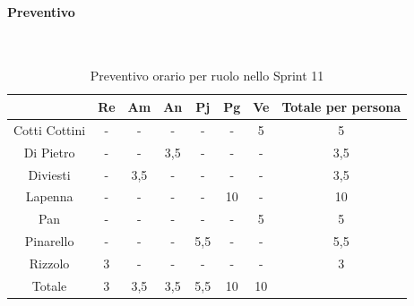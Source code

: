 \documentclass{article}
\begin{document}
                \paragraph{Preventivo}\mbox{}\\
                \begin{table}[H]
                    \centering
                    \begin{tabular}{|c|c|c|c|c|c|c|c|}
                    \hline
                                  & Re  & Am  & An  & Pj  & Pg  & Ve  & Totale per persona \\ \hline
                    Cotti Cottini & -   & -   & -   & -   & -   & 5   & 5                  \\ \hline
                    Di Pietro     & -   & -   & 3,5 & -   & -   & -   & 3,5                \\ \hline
                    Diviesti      & -   & 3,5 & -   & -   & -   & -   & 3,5                \\ \hline
                    Lapenna       & -   & -   & -   & -   & 10  & -   & 10                 \\ \hline
                    Pan           & -   & -   & -   & -   & -   & 5   & 5                  \\ \hline
                    Pinarello     & -   & -   & -   & 5,5 & -   & -   & 5,5                \\ \hline
                    Rizzolo       & 3   & -   & -   & -   & -   & -   & 3                  \\ \hline
                    Totale        & 3   & 3,5 & 3,5 & 5,5 & 10  & 10  &                    \\ \hline
                    \end{tabular}
                    \caption{Preventivo orario per ruolo nello Sprint 11}
                \end{table}

\end{document}
